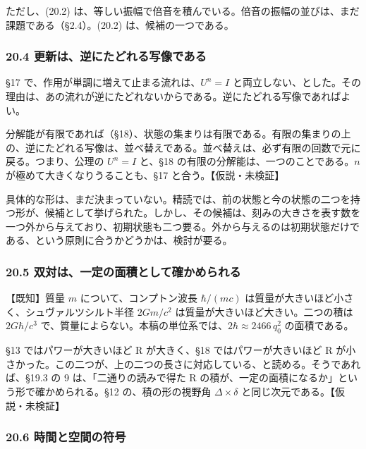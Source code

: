 \documentclass[
  a4paper,
]{ltjsarticle}
\begin{document}
ただし、(20.2)
は、等しい振幅で倍音を積んでいる。倍音の振幅の並びは、まだ課題である（§2.4）。(20.2)
は、候補の一つである。

\subsubsection{20.4
更新は、逆にたどれる写像である}\label{ux66f4ux65b0ux306fux9006ux306bux305fux3069ux308cux308bux5199ux50cfux3067ux3042ux308b}

§17 で、作用が単調に増えて止まる流れは、\(U^n = I\)
と両立しない、とした。その理由は、あの流れが逆にたどれないからである。逆にたどれる写像であればよい。

分解能が有限であれば（§18）、状態の集まりは有限である。有限の集まりの上の、逆にたどれる写像は、並べ替えである。並べ替えは、必ず有限の回数で元に戻る。つまり、公理の
\(U^n = I\) と、§18 の有限の分解能は、一つのことである。\(n\)
が極めて大きくなりうることも、§17 と合う。【仮説・未検証】

具体的な形は、まだ決まっていない。精読では、前の状態と今の状態の二つを持つ形が、候補として挙げられた。しかし、その候補は、刻みの大きさを表す数を一つ外から与えており、初期状態も二つ要る。外から与えるのは初期状態だけである、という原則に合うかどうかは、検討が要る。

\subsubsection{20.5
双対は、一定の面積として確かめられる}\label{ux53ccux5bfeux306fux4e00ux5b9aux306eux9762ux7a4dux3068ux3057ux3066ux78baux304bux3081ux3089ux308cux308b}

【既知】質量 \(m\) について、コンプトン波長 \(\hbar/(mc)\)
は質量が大きいほど小さく、シュヴァルツシルト半径 \(2Gm/c^2\)
は質量が大きいほど大きい。二つの積は \(2G\hbar/c^3\)
で、質量によらない。本稿の単位系では、\(2\hbar \approx 2466\,q_0^2\)
の面積である。

§13 ではパワーが大きいほど R が大きく、§18 ではパワーが大きいほど R
が小さかった。この二つが、上の二つの長さに対応している、と読める。そうであれば、§19.3
の 9 は、「二通りの読みで得た R
の積が、一定の面積になるか」という形で確かめられる。§12
の、積の形の視野角 \(\Delta\times\delta\)
と同じ次元である。【仮説・未検証】

\subsubsection{20.6
時間と空間の符号}\label{ux6642ux9593ux3068ux7a7aux9593ux306eux7b26ux53f7}
\end{document}
